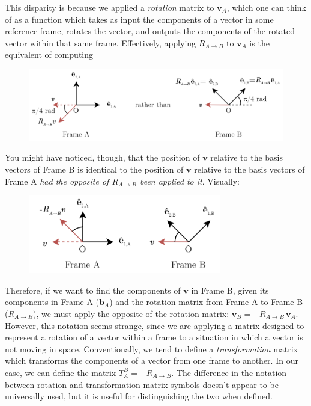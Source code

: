 This disparity is because we applied a \textit{rotation} matrix to $\bm{v}_A$,
which one can think of as a function which takes as input the components of
a vector in some reference frame, rotates the vector, and outputs the components
of the rotated vector within that same frame. Effectively, applying
$R_{A \to B}$ to $\bm{v}_A$ is the equivalent of computing

\begin{figure}[h!]
    \centering
    \includegraphics[width=\textwidth]{img/Incorrect Rotation of v.png}
\end{figure}

You might have noticed, though, that the position of $\bm{v}$ relative to the
basis vectors of Frame B is identical to the position of $\bm{v}$ relative to
the basis vectors of Frame A \textit{had the opposite of $R_{A \to B}$ been
applied to it}. Visually:

\begin{figure}[h!]
    \centering
    \includegraphics[width=0.75\textwidth]{img/Opposite Relative Rotation.png}
\end{figure}

Therefore, if we want to find the components of $\bm{v}$ in Frame B, given
its components in Frame A ($\bm{b}_A$) and the rotation matrix from Frame A
to Frame B ($R_{A \to B}$), we must apply the opposite of the rotation matrix:
$\bm{v}_B = -R_{A \to B} \, \bm{v}_A$. However, this notation seems strange,
since we are applying a matrix designed to represent a rotation of a vector
within a frame to a situation in which a vector is not moving in space.
Conventionally, we tend to define a \textit{transformation} matrix which
transforms the components of a vector from one frame to another. In our case,
we can define the matrix $T_A^B = -R_{A \to B}$. The difference in the notation
between rotation and transformation matrix symbols doesn't appear to be
universally used, but it is useful for distinguishing the two when defined.

